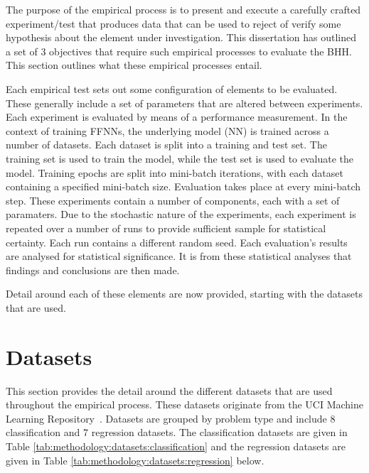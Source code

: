 The purpose of the empirical process is to present and execute a carefully crafted experiment/test that produces data that can be used to reject of verify some hypothesis about the element under investigation. This dissertation has outlined a set of 3 objectives that require such empirical processes to evaluate the \ac{BHH}. This section outlines what these empirical processes entail.

Each empirical test sets out some configuration of elements to be evaluated. These generally include a set of parameters that are altered between experiments. Each experiment is evaluated by means of a performance measurement. In the context of training \acp{FFNN}, the underlying model (\ac{NN}) is trained across a number of datasets. Each dataset is split into a training and test set. The training set is used to train the model, while the test set is used to evaluate the model. Training epochs are split into mini-batch iterations, with each dataset containing a specified mini-batch size. Evaluation takes place at every mini-batch step. These experiments contain a number of components, each with a set of paramaters. Due to the stochastic nature of the experiments, each experiment is repeated over a number of runs to provide sufficient sample for statistical certainty. Each run contains a different random seed. Each evaluation's results are analysed for statistical significance. It is from these statistical analyses that findings and conclusions are then made.

Detail around each of these elements are now provided, starting with the datasets that are used.

\section{Datasets}
\label{sec:methodology:datasets}

This section provides the detail around the different datasets that are used throughout the empirical process. These datasets originate from the UCI Machine Learning Repository~\cite{ref:uci:2022}. Datasets are grouped by problem type and include 8 classification and 7 regression datasets. The classification datasets are given in Table \ref{tab:methodology:datasets:classification} and the regression datasets are given in Table \ref{tab:methodology:datasets:regression} below.

